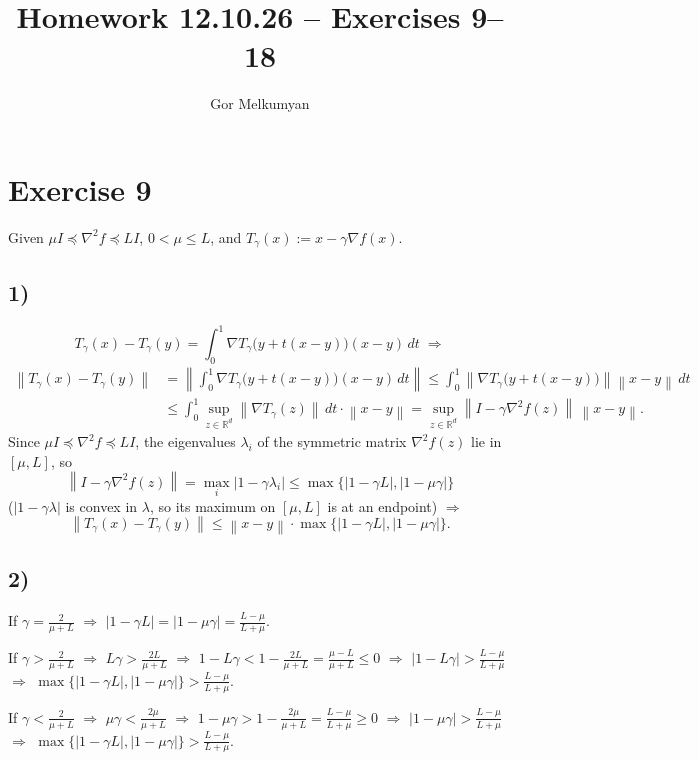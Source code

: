 \documentclass[11pt,a4paper]{article}
\title{Homework 12.10.26 -- Exercises 9--18}
\author{Gor Melkumyan}
\date{}
\newcommand{\R}{\mathbb{R}}
\newcommand{\norm}[1]{\left\| #1 \right\|}
\begin{document}
\maketitle

\section*{Exercise 9}

Given $\mu I \preceq \nabla^2 f \preceq L I$, $0 < \mu \le L$, and
$T_\gamma(x) := x - \gamma \nabla f(x)$.

\subsection*{1)}
\[
  T_\gamma(x) - T_\gamma(y) = \int_0^1 \nabla T_\gamma\bigl(y + t(x-y)\bigr)(x-y)\,dt
  \;\Rightarrow
\]
\begin{align*}
  \norm{T_\gamma(x) - T_\gamma(y)}
  &= \norm{\int_0^1 \nabla T_\gamma\bigl(y + t(x-y)\bigr)(x-y)\,dt}
  \le \int_0^1 \norm{\nabla T_\gamma\bigl(y + t(x-y)\bigr)}\norm{x-y}\,dt \\
  &\le \int_0^1 \sup_{z \in \R^d}\norm{\nabla T_\gamma(z)}\,dt \cdot \norm{x-y}
  = \sup_{z \in \R^d}\norm{I - \gamma \nabla^2 f(z)}\,\norm{x-y}.
\end{align*}
Since $\mu I \preceq \nabla^2 f \preceq L I$, the eigenvalues $\lambda_i$ of the
symmetric matrix $\nabla^2 f(z)$ lie in $[\mu, L]$, so
\[
  \norm{I - \gamma \nabla^2 f(z)} = \max_i |1 - \gamma\lambda_i|
  \le \max\{|1-\gamma L|, |1-\mu\gamma|\}
\]
($|1-\gamma\lambda|$ is convex in $\lambda$, so its maximum on $[\mu, L]$ is at an endpoint)
$\Rightarrow$
\[
  \norm{T_\gamma(x) - T_\gamma(y)} \le \norm{x-y}\cdot\max\{|1-\gamma L|, |1-\mu\gamma|\}.
\]

\subsection*{2)}
If $\gamma = \frac{2}{\mu+L}$ $\Rightarrow$
$|1-\gamma L| = |1-\mu\gamma| = \frac{L-\mu}{L+\mu}$.

If $\gamma > \frac{2}{\mu+L}$ $\Rightarrow$ $L\gamma > \frac{2L}{\mu+L}$ $\Rightarrow$
$1 - L\gamma < 1 - \frac{2L}{\mu+L} = \frac{\mu-L}{\mu+L} \le 0$ $\Rightarrow$
$|1-L\gamma| > \frac{L-\mu}{L+\mu}$ $\Rightarrow$
$\max\{|1-\gamma L|, |1-\mu\gamma|\} > \frac{L-\mu}{L+\mu}$.

If $\gamma < \frac{2}{\mu+L}$ $\Rightarrow$ $\mu\gamma < \frac{2\mu}{\mu+L}$ $\Rightarrow$
$1 - \mu\gamma > 1 - \frac{2\mu}{\mu+L} = \frac{L-\mu}{L+\mu} \ge 0$ $\Rightarrow$
$|1-\mu\gamma| > \frac{L-\mu}{L+\mu}$ $\Rightarrow$
$\max\{|1-\gamma L|, |1-\mu\gamma|\} > \frac{L-\mu}{L+\mu}$.
\end{document}
